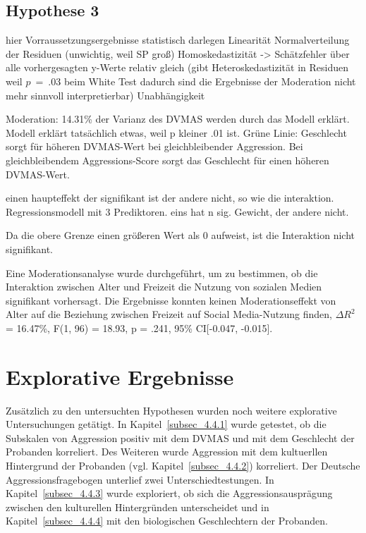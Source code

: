 \subsection{Hypothese 3}    \label{subsec_4.3.3}
hier Vorraussetzungsergebnisse statistisch darlegen
Linearität
Normalverteilung der Residuen (unwichtig, weil SP groß)
Homoskedastizität -> Schätzfehler über alle vorhergesagten y-Werte relativ gleich (gibt Heteroskedastizität in Residuen weil $p$~=~.03 beim White Test dadurch sind die Ergebnisse der Moderation nicht mehr sinnvoll interpretierbar)
Unabhängigkeit

Moderation: 14.31\% der Varianz des DVMAS werden durch das Modell erklärt.
Modell erklärt tatsächlich etwas, weil p kleiner .01 ist.
Grüne Linie: Geschlecht sorgt für höheren DVMAS-Wert bei gleichbleibender Aggression. Bei gleichbleibendem Aggressions-Score sorgt das Geschlecht für einen höheren DVMAS-Wert.

einen haupteffekt der signifikant ist der andere nicht, so wie die interaktion. Regressionsmodell mit 3 Prediktoren. eins hat n sig. Gewicht, der andere nicht.

Da die obere Grenze einen größeren Wert als 0 aufweist, ist die Interaktion nicht signifikant.

Eine Moderationsanalyse wurde durchgeführt, um zu bestimmen, ob die Interaktion zwischen Alter und Freizeit die Nutzung von sozialen Medien signifikant vorhersagt. Die Ergebnisse konnten keinen Moderationseffekt von Alter auf die Beziehung zwischen Freizeit auf Social Media-Nutzung finden, $\Delta R^{2}$ = 16.47\%, F(1, 96) = 18.93, p = .241, 95\% CI[-0.047, -0.015].


\section{Explorative Ergebnisse}    \label{sec_4.4}
Zusätzlich zu den untersuchten Hypothesen wurden noch weitere explorative Untersuchungen getätigt. In Kapitel~\ref{subsec_4.4.1} wurde getestet, ob die Subskalen von Aggression positiv mit dem DVMAS und mit dem Geschlecht der Probanden korreliert. Des Weiteren wurde Aggression mit dem kultuerllen Hintergrund der Probanden (vgl. Kapitel~\ref{subsec_4.4.2}) korreliert. Der Deutsche Aggressionsfragebogen unterlief zwei Unterschiedtestungen. In Kapitel~\ref{subsec_4.4.3} wurde exploriert, ob sich die Aggressionsausprägung zwischen den kulturellen Hintergründen unterscheidet und in Kapitel~\ref{subsec_4.4.4} mit den biologischen Geschlechtern der Probanden.

